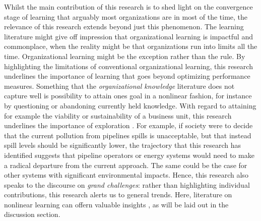 Whilst the main contribution of this research is to shed light on the convergence stage of learning that arguably most organizations are in most of the time, the relevance of this research extends beyond just this phenomenon. The learning literature might give off impression that organizational learning is impactful and commonplace, when the reality might be that organizations run into limits all the time. Organizational learning might be the exception rather than the rule. By highlighting the limitations of conventional organizational learning, this research underlines the importance of learning that goes beyond optimizing performance measures. Something that the \textit{organizational knowledge} literature does not capture well is possibility to attain ones goal in a nonlinear fashion, for instance by questioning or abandoning currently held knowledge. With regard to attaining for example the viability or sustainability of a business unit, this research underlines the importance of exploration \citep{March1991}. For example, if society were to decide that the current pollution from pipelines spills is unacceptable, but that instead spill levels should be significantly lower, the trajectory that this research has identified suggests that pipeline operators or energy systems would need to make a radical departure from the current approach. The same could be the case for other systems with significant environmental impacts. Hence, this research also speaks to the discourse on \textit{grand challenges}: rather than highlighting individual contributions, this research alerts us to general trends. Here, literature on nonlinear learning can offern valuable insights \citep[e.g.,][]{Argyris1978, March2010}, as will be laid out in the discussion section.




